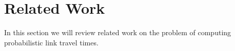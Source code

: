 \section{Related Work}
\label{sec:related}
In this section we will review related work on the problem of computing probabilistic link travel times.



